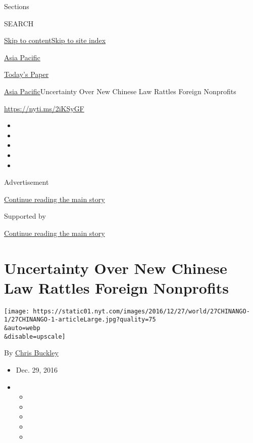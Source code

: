 Sections

SEARCH

\protect\hyperlink{site-content}{Skip to
content}\protect\hyperlink{site-index}{Skip to site index}

\href{https://www.nytimes.com/section/world/asia}{Asia Pacific}

\href{https://myaccount.nytimes.com/auth/login?response_type=cookie\&client_id=vi}{}

\href{https://www.nytimes.com/section/todayspaper}{Today's Paper}

\href{/section/world/asia}{Asia Pacific}\textbar{}Uncertainty Over New
Chinese Law Rattles Foreign Nonprofits

\url{https://nyti.ms/2iKSyGF}

\begin{itemize}
\item
\item
\item
\item
\item
\end{itemize}

Advertisement

\protect\hyperlink{after-top}{Continue reading the main story}

Supported by

\protect\hyperlink{after-sponsor}{Continue reading the main story}

\hypertarget{uncertainty-over-new-chinese-law-rattles-foreign-nonprofits}{%
\section{Uncertainty Over New Chinese Law Rattles Foreign
Nonprofits}\label{uncertainty-over-new-chinese-law-rattles-foreign-nonprofits}}

\texttt{[image: https://static01.nyt.com/images/2016/12/27/world/27CHINANGO-1/27CHINANGO-1-articleLarge.jpg?quality=75\\\&auto=webp\\\&disable=upscale]}

By \href{http://www.nytimes.com/by/chris-buckley}{Chris Buckley}

\begin{itemize}
\item
  Dec. 29, 2016
\item
  \begin{itemize}
  \item
  \item
  \item
  \item
  \item
  \end{itemize}
\end{itemize}

